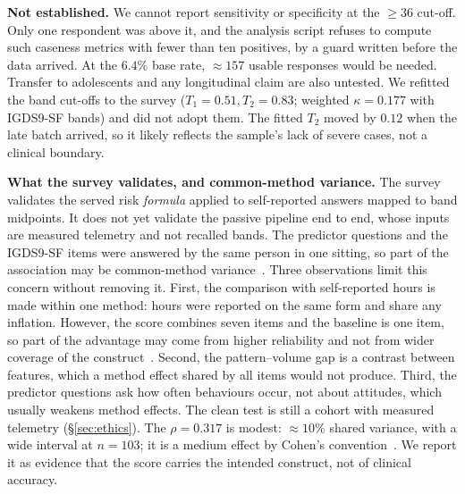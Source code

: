 \documentclass[conference]{IEEEtran}
\begin{document}
\textbf{Not established.} We cannot report sensitivity or specificity at the
$\geq$$36$ cut-off. Only one respondent was above it, and the analysis script refuses
to compute such caseness metrics with fewer than ten positives, by a guard written
before the data arrived. At the $6.4\%$ base rate, $\approx$$157$ usable responses
would be needed. Transfer to adolescents and any longitudinal claim are also untested.
We refitted the band cut-offs to the survey ($T_1{=}0.51,T_2{=}0.83$; weighted
$\kappa{=}0.177$ with IGDS9-SF bands) and did not adopt them. The fitted $T_2$ moved by
$0.12$ when the late batch arrived, so it likely reflects the sample's lack of severe
cases, not a clinical boundary.

\textbf{What the survey validates, and common-method variance.} The survey validates
the served risk \emph{formula} applied to self-reported answers mapped to band
midpoints. It does not yet validate the passive pipeline end to end, whose inputs are
measured telemetry and not recalled bands. The predictor questions and the IGDS9-SF
items were answered by the same person in one sitting, so part of the association may
be common-method variance~\cite{podsakoff2003}. Three observations limit this concern
without removing it. First, the comparison with self-reported hours is made within one
method: hours were reported on the same form and share any inflation. However, the
score combines seven items and the baseline is one item, so part of the advantage may
come from higher reliability and not from wider coverage of the
construct~\cite{westfall2016}. Second, the pattern--volume gap is a contrast between
features, which a method effect shared by all items would not produce. Third, the
predictor questions ask how often behaviours occur, not about attitudes, which usually
weakens method effects. The clean test is still a cohort with measured telemetry
(\S\ref{sec:ethics}). The $\rho{=}0.317$ is modest: $\approx$$10\%$ shared variance,
with a wide interval at $n{=}103$; it is a medium effect by Cohen's
convention~\cite{cohen1988}. We report it as evidence that the score carries the
intended construct, not of clinical accuracy.
\end{document}
